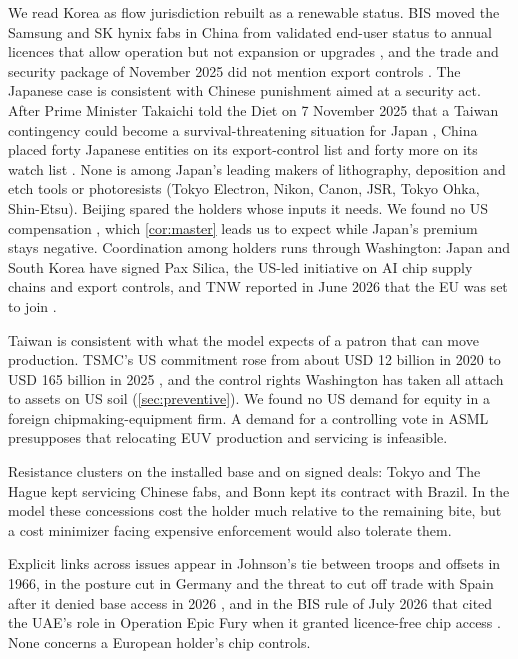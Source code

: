 We read Korea as flow jurisdiction rebuilt as a renewable status. BIS moved the Samsung and SK hynix fabs in China from validated end-user status to annual licences that allow operation but not expansion or upgrades \citep{afs2025veu, skhynix2026prospectus, reuters2025koreanlicence}, and the trade and security package of November 2025 did not mention export controls \citep{whitehouse2025korea}. The Japanese case is consistent with Chinese punishment aimed at a security act. After Prime Minister Takaichi told the Diet on 7 November 2025 that a Taiwan contingency could become a survival-threatening situation for Japan \citep{kokkai2025takaichi}, China placed forty Japanese entities on its export-control list and forty more on its watch list \citep{mofcom2026japan11, mofcom2026japan27}. None is among Japan's leading makers of lithography, deposition and etch tools or photoresists (Tokyo Electron, Nikon, Canon, JSR, Tokyo Ohka, Shin-Etsu). Beijing spared the holders whose inputs it needs. We found no US compensation \citep{teer2026dismantling}, which \cref{cor:master} leads us to expect while Japan's premium stays negative. Coordination among holders runs through Washington: Japan and South Korea have signed Pax Silica, the US-led initiative on AI chip supply chains and export controls, and TNW reported in June 2026 that the EU was set to join \citep{tnw2026paxsilica}.

Taiwan is consistent with what the model expects of a patron that can move production. TSMC's US commitment rose from about USD 12 billion in 2020 to USD 165 billion in 2025 \citep{tsmc2020arizona, tsmc2025expand}, and the control rights Washington has taken all attach to assets on US soil (\cref{sec:preventive}). We found no US demand for equity in a foreign chipmaking-equipment firm. A demand for a controlling vote in ASML presupposes that relocating EUV production and servicing is infeasible.

Resistance clusters on the installed base and on signed deals: Tokyo and The Hague kept servicing Chinese fabs, and Bonn kept its contract with Brazil. In the model these concessions cost the holder much relative to the remaining bite, but a cost minimizer facing expensive enforcement would also tolerate them.

Explicit links across issues appear in Johnson's tie between troops and offsets in 1966, in the posture cut in Germany and the threat to cut off trade with Spain after it denied base access in 2026 \citep{martinez2026germany, roque2026spain, omullony2026ankara}, and in the BIS rule of July 2026 that cited the UAE's role in Operation Epic Fury when it granted licence-free chip access \citep{bis2026uae}. None concerns a European holder's chip controls.


